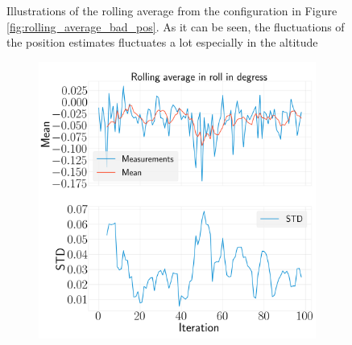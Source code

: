 \documentclass[../Head/report.tex]{subfiles}
\begin{document}
\begin{figure}[H]
\begin{subfigure}[t]{.30\textwidth}
        \caption{}
        \label{fig:rolling_average_in_z_test2}
    \end{subfigure}
    \caption{Illustrations of the rolling average from the configuration in Figure \ref{fig:rolling_average_bad_pos}. As it can be seen, the fluctuations of the position estimates fluctuates a lot especially in the altitude}
    \label{fig:rolling_average_pos_test2}
\end{figure}

\begin{figure}[H]
    \centering
    \begin{subfigure}[t]{.30\textwidth}
        \centering
        \includegraphics[width=\textwidth]{../Figures/analyse_rolling_average/test2/Calculated_rolling_average_in_roll_with_mean_and_STD.png}
        \caption{}
        \label{fig:rolling_average_in_roll_test2}
    \end{subfigure}
     \hspace{0.2em}
    \begin{subfigure}[t]{.30\textwidth}
        \centering

\end{subfigure}
\end{figure}
\end{document}
